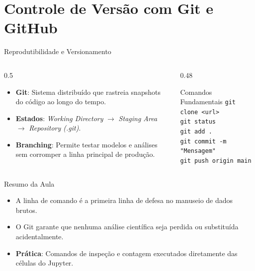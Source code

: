 \documentclass[aspectratio=169, 10pt]{beamer}
\begin{document}
\section{Controle de Versão com Git e GitHub}

\begin{frame}{Reprodutibilidade e Versionamento}
  \begin{columns}
    \begin{column}{0.5\textwidth}
      \begin{itemize}
        \item \textbf{Git}: Sistema distribuído que rastreia snapshots do código ao longo do tempo.
        \item \textbf{Estados}: \textit{Working Directory} $\rightarrow$ \textit{Staging Area} $\rightarrow$ \textit{Repository (.git)}.
        \item \textbf{Branching}: Permite testar modelos e análises sem corromper a linha principal de produção.
      \end{itemize}
    \end{column}
    \begin{column}{0.48\textwidth}
      \begin{block}{Comandos Fundamentais}
        \texttt{git clone <url>} \\
        \texttt{git status} \\
        \texttt{git add .} \\
        \texttt{git commit -m "Mensagem"} \\
        \texttt{git push origin main}
      \end{block}
    \end{column}
  \end{columns}
\end{frame}

\begin{frame}{Resumo da Aula}
  \begin{itemize}
    \item A linha de comando é a primeira linha de defesa no manuseio de dados brutos.
    \item O Git garante que nenhuma análise científica seja perdida ou substituída acidentalmente.
    \item \textbf{Prática}: Comandos de inspeção e contagem executados diretamente das células do Jupyter.
  \end{itemize}
\end{frame}
\end{document}
